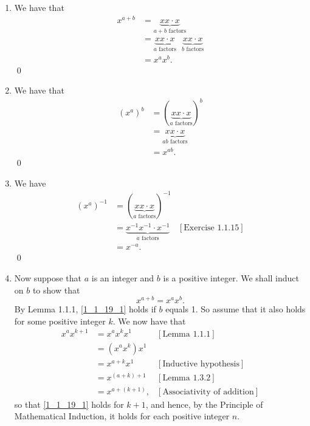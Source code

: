 \begin{enumerate}
      \begin{enumerate}
         \item We have that
               \begin{align*}
                  x^{a+b} &= \underbrace{xx\cdot x}_{a+b \text{ factors}} \\
                          &= \underbrace{xx\cdot x}_{a \text{ factors}}\mbox{ }
                             \underbrace{xx\cdot x}_{b \text{ factors}} \\
                          &= x^ax^b.
               \end{align*} \qed
         \item We have that
               \begin{align*}
                  (x^a)^b &= (\underbrace{xx\cdot x}_{a \text{ factors}})^b \\
                          &= \underbrace{xx\cdot x}_{ab \text{ factors}} \\
                          &= x^{ab}.
               \end{align*} \qed
         \item We have
               \begin{align*}
                  (x^a)^{-1}
                     &= (\underbrace{xx\cdot x}_{a \text{ factors}})^{-1} \\
                     &= \underbrace{x^{-1}x^{-1}\cdot x^{-1}}_{
                           a \text{ factors}} &[\text{Exercise 1.1.15}] \\
                     &= x^{-a}.
               \end{align*} \qed
         \item Now suppose that $a$ is an integer and $b$ is a positive integer.
               We shall induct on $b$ to show that
               \begin{equation}
                  x^{a+b} = x^ax^b. \label{1_1_19_1}
               \end{equation}
               By Lemma 1.1.1, \eqref{1_1_19_1} holds if $b$ equals 1. So assume
               that it also holds for some positive integer $k$. We now have
               that
               \begin{align*}
                  x^ax^{k+1} &= x^ax^kx^1 &[\text{Lemma 1.1.1}] \\
                             &= (x^ax^k)x^1 \\
                             &= x^{a+k}x^1 &[\text{Inductive hypothesis}] \\
                             &= x^{(a+k)+1} &[\text{Lemma 1.3.2}] \\
                             &= x^{a+(k+1)}, &[\text{Associativity of addition}]
               \end{align*}
               so that \eqref{1_1_19_1} holds for $k + 1$, and hence, by the 
               Principle of Mathematical Induction, it holds for each positive
               integer $n$. \\


\end{enumerate}
\end{enumerate}
